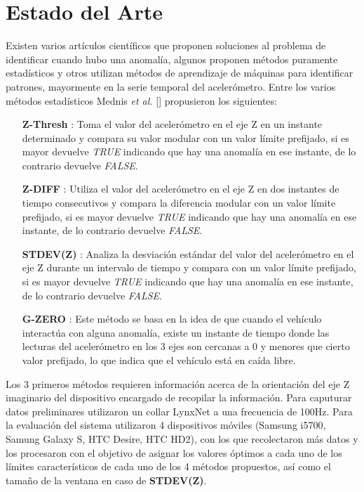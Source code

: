 \chapter{Estado del Arte}\label{chapter:state-of-the-art}

Existen varios artículos científicos que proponen soluciones al problema de identificar cuando hubo una anomalía, algunos proponen métodos
puramente estadísticos y otros utilizan métodos de aprendizaje de máquinas para identificar patrones, mayormente en la serie temporal del
acelerómetro. Entre los varios métodos estadísticos Mednis {\it et al.} [] propusieron los siguientes:\\

\begin{enumerate}
\item [ \textbf {Z-Thresh} ]: Toma el valor del acelerómetro en el eje Z en un instante determinado y compara su valor modular con 
	un valor límite prefijado, si es mayor devuelve {\it TRUE} indicando que hay una anomalía en ese instante, de lo contrario devuelve {\it FALSE}.\\
	\item [ \textbf {Z-DIFF} ]: Utiliza el valor del acelerómetro en el eje Z en dos instantes de tiempo consecutivos y compara la
		diferencia modular con un valor límite prefijado, si es mayor devuelve {\it TRUE} indicando que hay una anomalía en ese instante, de lo contrario devuelve {\it FALSE}.\\
	\item [ \textbf {STDEV(Z)} ]: Analiza la desviación estándar del valor del acelerómetro en el eje Z durante un intervalo de
		tiempo y compara con un valor límite prefijado, si es mayor devuelve {\it TRUE} indicando que hay una anomalía en ese instante, de lo contrario devuelve {\it FALSE}.\\ 
	\item [ \textbf {G-ZERO} ]: Este método se basa en la idea de que cuando el vehículo interactúa con alguna anomalía, existe un
		instante de tiempo donde las lecturas del acelerómetro en los 3 ejes son cercanas a 0 y menores que cierto valor prefijado, lo que indica que el vehículo está en caída libre.\\
\end{enumerate}

Los 3 primeros métodos requieren información acerca de la orientación del eje Z imaginario del dispositivo encargado de recopilar la información. 
Para caputurar datos preliminares utilizaron un collar LynxNet a una frecuencia de 100Hz. Para la evaluación del sistema utilizaron 4 dispositivos
móviles (Samsung i5700, Samung Galaxy S, HTC Desire, HTC HD2), con los que recolectaron más datos y los procesaron con el objetivo de asignar los 
valores óptimos a cada uno de los límites característicos de cada uno de los 4 métodos propuestos, así como el tamaño de la ventana en caso de 
\textbf {STDEV(Z)}.\\

